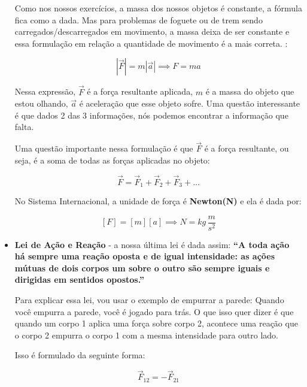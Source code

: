 \documentclass[12pt]{extarticle}
\newcommand{\<}{\langle}
\renewcommand{\>}{\rangle}
\theoremstyle{definition}
\begin{document}
\begin{itemize}
{    Como nos nossos exercícios, a massa dos nossos objetos é constante, a fórmula fica como a dada. Mas para problemas de foguete ou de trem sendo carregados/descarregados em movimento, a massa deixa de ser constante e essa formulação em relação a quantidade de movimento é a mais correta.} :
    
    \begin{equation}\label{eq:newton_scalar}
        |\Vec{F}| = m|\Vec{a}| \implies F=ma
    \end{equation}
    
    
    Nessa expressão, $\Vec{F}$ é a força resultante aplicada, $m$ é a massa do objeto que estou olhando, $\Vec{a}$ é aceleração que esse objeto sofre. Uma questão interessante é que dados 2 das 3 informações, nós podemos encontrar a informação que falta.
    
    Uma questão importante nessa formulação é que $\Vec{F}$ é a força resultante, ou seja, é a soma de todas as forças aplicadas no objeto:
    
    \begin{equation}
        \Vec{F} = \Vec{F}_1 + \Vec{F}_2 + \Vec{F}_3 + \dots
    \end{equation}
    
    No Sistema Internacional, a unidade de força é \textbf{Newton(N)} e ela é dada por:
    
    \begin{equation}
        \left[F \right] = [m][a] \implies N = kg\,\frac{m}{s^2}
    \end{equation}
    
    \newpage
    \item  \textbf{Lei de Ação e Reação} - a nossa última lei é dada assim: \textbf{“A toda ação há sempre uma reação oposta e de igual intensidade: as ações mútuas de dois corpos um sobre o outro são sempre iguais e dirigidas em sentidos opostos.”}
    
    Para explicar essa lei, vou usar o exemplo de empurrar a parede: Quando você empurra a parede, você é jogado para trás. O que isso quer dizer é que quando um corpo 1 aplica uma força sobre corpo 2, acontece uma reação que o corpo 2 empurra o corpo 1 com a mesma intensidade para outro lado.
    
    Isso é formulado da seguinte forma:
    
    \begin{equation}
        \Vec{F}_{12} = - \Vec{F}_{21}
    \end{equation}
    

\end{itemize}
\end{document}
